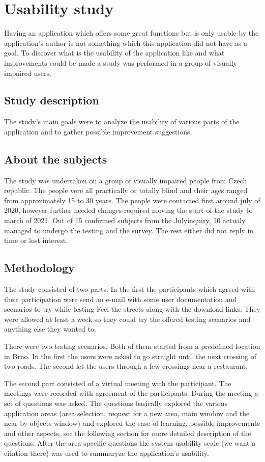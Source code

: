 \documentclass[nolof,digital]{fithesis3}
\begin{document}
\chapter{Usability study}
Having an application which offers some great functions but is only usable by the application's author is not something which this application did not have as a goal. To discover what is the usability of the application like and what improvements could be made a study was performed in a group of visually impaired users.
\section{Study description}
The study's main goals were to analyze the usability of various parts of the application and to gather possible improvement suggestions.
\section{About the subjects}
The study was undertaken on a group of visually impaired people from Czech republic. The people vere all practically or totally blind and their ages ranged from approximately 15 to 30 years. The people were contacted first around july of 2020, however further needed changes required moving the start of the study to march of 2021. Out of 15 confirmed subjects from the Julyinquiry, 10 actualy managed to undergo the testing and the survey. The rest either did not reply in time or lost interest.
\section{Methodology}
The study consisted of two parts. In the first the participants which agreed with their participation were send an e-mail with some user documentation and scenarios to try while testing Feel the streets along with the download links. They were allowed at least a week so they could try the offered testing scenarios and anything else they wanted to.

There were two testing scenarios. Both of them started from a predefined location in Brno. In the first the users were asked to go straight until the next crossing of two roads. The second let the users through a few crossings near a restaurant.

The second part consisted of a virtual meeting with the participant. The meetings were recorded with agreement of the participants. During the meeting a set of questions was asked. The questions basically explored the various application areas (area selection, request for a new area, main window and the near by objects window) and explored the ease of learning, possible improvements and other aspects, see the following section for more detailed description of the questions. After the area specific questions the system usability scale (we want a citation there) was used to summaryze the application's usability.
\end{document}
